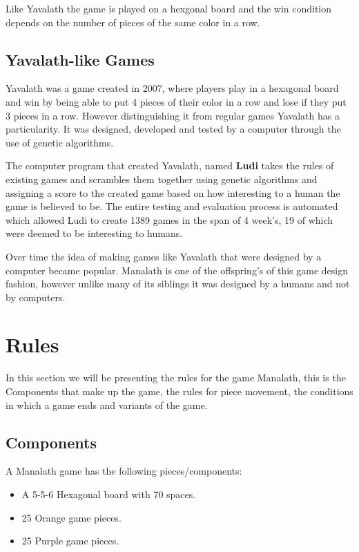 \documentclass[12pt]{article}
\begin{document}
  Like Yavalath the game is played on a hexgonal board and the win condition depends on the number of pieces of the same color in a row.
\subsection{Yavalath-like Games}
\hspace{0.6cm}
  Yavalath was a game created in 2007, where players play in a hexagonal board and win by being able to put 4 pieces of their color in a row and
  lose if they put 3 pieces in a row.
  However distinguishing it from regular games Yavalath has a particularity. It
  was designed, developed and tested by a computer through the use of genetic
  algorithms.

  The computer program that created Yavalath, named \textbf{Ludi} takes the rules
  of existing games and scrambles them together using genetic algorithms and
  assigning a score to the created game based on how interesting to a human the
  game is believed to be. The entire testing and evaluation process is automated
  which allowed Ludi to create 1389 games in the span of 4 week's, 19 of which
  were deemed to be interesting to humans.

  Over time the idea of making games like Yavalath that were designed by a
  computer became popular. Manalath is one of the offspring's of this game design
  fashion, however unlike many of its siblings it was designed by a humans and
  not by computers.

\pagebreak
\section{Rules}
\hspace{0.6cm}
    In this section we will be presenting the rules for the game Manalath, this is
    the Components that make up the game, the rules for piece movement, the conditions
    in which a game ends and variants of the game.
  \subsection{Components}
\hspace{0.6cm}
    A Manalath game has the following pieces/components:
    \begin{itemize}
        \item A 5-5-6 Hexagonal board with 70 spaces.
        \item 25 Orange game pieces.
        \item 25 Purple game pieces.
  \end{itemize}
\end{document}
